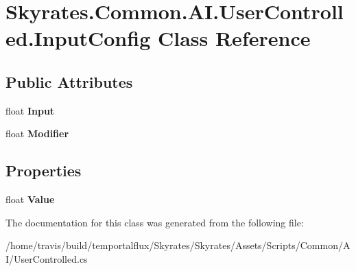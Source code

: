 \hypertarget{class_skyrates_1_1_common_1_1_a_i_1_1_user_controlled_1_1_input_config}{\section{Skyrates.\-Common.\-A\-I.\-User\-Controlled.\-Input\-Config Class Reference}
\label{class_skyrates_1_1_common_1_1_a_i_1_1_user_controlled_1_1_input_config}
}
\subsection*{Public Attributes}
\begin{DoxyCompactItemize}
\item 
\hypertarget{class_skyrates_1_1_common_1_1_a_i_1_1_user_controlled_1_1_input_config_ab6d49c94c657e15b1f8e8b8fd7d32546}{float {\bfseries Input}}\label{class_skyrates_1_1_common_1_1_a_i_1_1_user_controlled_1_1_input_config_ab6d49c94c657e15b1f8e8b8fd7d32546}

\item 
\hypertarget{class_skyrates_1_1_common_1_1_a_i_1_1_user_controlled_1_1_input_config_aeea2ce6e2082fb16681fda44e77fb96b}{float {\bfseries Modifier}}\label{class_skyrates_1_1_common_1_1_a_i_1_1_user_controlled_1_1_input_config_aeea2ce6e2082fb16681fda44e77fb96b}

\end{DoxyCompactItemize}
\subsection*{Properties}
\begin{DoxyCompactItemize}
\item 
\hypertarget{class_skyrates_1_1_common_1_1_a_i_1_1_user_controlled_1_1_input_config_a89e0b0e534313b2872cb068a3015df86}{float {\bfseries Value}}\label{class_skyrates_1_1_common_1_1_a_i_1_1_user_controlled_1_1_input_config_a89e0b0e534313b2872cb068a3015df86}

\end{DoxyCompactItemize}


The documentation for this class was generated from the following file\-:\begin{DoxyCompactItemize}
\item 
/home/travis/build/temportalflux/\-Skyrates/\-Skyrates/\-Assets/\-Scripts/\-Common/\-A\-I/User\-Controlled.\-cs\end{DoxyCompactItemize}
